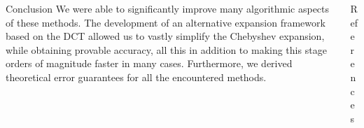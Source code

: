 \documentclass[final, leqno, 12pt]{beamer}
\begin{document}
\begin{frame}[t]
\begin{columns}[t]
    \begin{column}{0.45\paperwidth}
        \begin{block}{Conclusion}
            We were able to significantly improve many algorithmic aspects of these
            methods. The development of an alternative expansion framework based on
            the \gls{DCT} allowed us to vastly simplify the Chebyshev expansion,
            while obtaining provable accuracy, all
            this in addition to making this stage orders of magnitude faster in many cases.
            Furthermore, we derived theoretical error guarantees for all the encountered methods.
        \end{block}
    \end{column}
    \begin{column}{0.45\paperwidth}
        \begin{block}{References}
            \vspace{-10pt}
            
        
        \end{block}
    \end{column}
\end{columns}

\end{frame}
\end{document}
